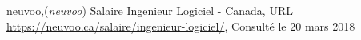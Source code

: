 \begin{thebibliographyUL}{99}

neuvoo,(\emph{neuvoo}) Salaire Ingenieur Logiciel - Canada, URL \url{https://neuvoo.ca/salaire/ingenieur-logiciel/}, Consulté le 20 mars 2018
\end{thebibliographyUL}